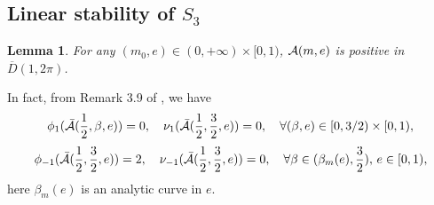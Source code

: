 \documentclass[11pt]{article}
\newtheorem{lemma}{Lemma}[section]
\def\cA{{\cal A}}
\def\ol#1{\overline{#1}}
\begin{document}
\subsection{Linear stability of \texorpdfstring{$S_3$}{S\_3}}

\begin{lemma}
    For any $(m_0,e)\in(0,+\infty)\times[0,1)$,
    $\cA(m,e)$ is positive in $\ol{D}(1,2\pi)$.
\end{lemma}

In fact, from Remark 3.9 of \cite{Hu2020}, we have
\begin{equation}
    \phi_{1}(\bar\cA({1\over2},\beta,e))=0,
    \quad
    \nu_{1}(\bar\cA({1\over2},{3\over2},e))=0,
    \quad
    \forall (\beta,e)\in[0,3/2)\times[0,1),
     \end{equation}
    \begin{equation}
      \phi_{-1}(\bar\cA({1\over2},{3\over2},e))=2,
    \quad
    \nu_{-1}(\bar\cA({1\over2},{3\over2},e))=0,
    \quad
    \forall \beta\in (\beta_m(e),{3\over2}), \, e\in[0,1),
\end{equation}
here $\beta_m(e)$ is an analytic curve in $e$. 
\end{document}
